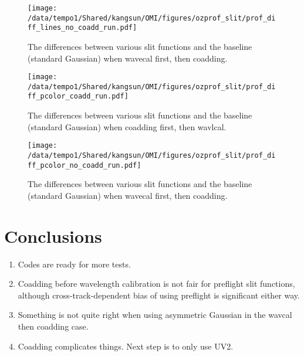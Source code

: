 \documentclass[hidelinks,12pt]{article}
\begin{document}
\begin{figure}[hbtp]
  \begin{center}
    \texttt{[image: /data/tempo1/Shared/kangsun/OMI/figures/ozprof\_slit/prof\_diff\_lines\_no\_coadd\_run.pdf]}
  \caption{The differences between various slit functions and the baseline (standard Gaussian) when wavecal first, then coadding.}
    \label{fig7}
  \end{center}
\end{figure}


\begin{figure}[hbtp]
  \begin{center}
    \texttt{[image: /data/tempo1/Shared/kangsun/OMI/figures/ozprof\_slit/prof\_diff\_pcolor\_coadd\_run.pdf]}
  \caption{The differences between various slit functions and the baseline (standard Gaussian) when coadding first, then wavlcal.}
    \label{fig8}
  \end{center}
\end{figure}


\begin{figure}[hbtp]
  \begin{center}
    \texttt{[image: /data/tempo1/Shared/kangsun/OMI/figures/ozprof\_slit/prof\_diff\_pcolor\_no\_coadd\_run.pdf]}
  \caption{The differences between various slit functions and the baseline (standard Gaussian) when wavecal first, then coadding.}
    \label{fig9}
  \end{center}
\end{figure}
\FloatBarrier
\section{Conclusions}
\begin{enumerate}
\item Codes are ready for more tests.
\item Coadding before wavelength calibration is not fair for preflight slit functions, although cross-track-dependent bias of using preflight is significant either way.
\item Something is not quite right when using asymmetric Gaussian in the wavcal then coadding case.
\item Coadding complicates things. Next step is to only use UV2.
\end{enumerate}
\end{document}
